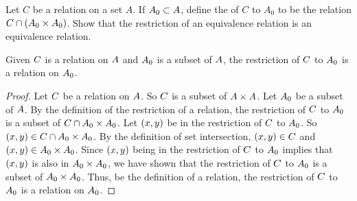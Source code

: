\documentclass[../main.tex]{subfiles}
\begin{document}
\problem{}\label{s03p02}

Let \(C\) be a relation on a set \(A\). If \(A_0 \subset A\), define the
 of \(C\) to \(A_0\) to be the relation
\(C \cap (A_0 \times A_0)\). Show that the restriction of an equivalence
relation is an equivalence relation.

\begin{thm}
	Given \({C}\) is a relation on \({A}\) and
	\({A_0}\) is a subset of \({A}\), the restriction of
	\({C}\) to \({A_0}\) is a relation on
	\({A_0}\).
\end{thm}
\begin{proof}
	Let \({C}\) be a relation on \({A}\). So
	\({C}\) is a subset of
	\({{A}} \times {{A}}\). Let \({A_0}\)
	be a subset of \({A}\). By the definition of the restriction of a
	relation, the restriction of \({C}\) to \({A_0}\) is
	a subset of
	\({C} \cap {{A_0}} \times {{A_0}}\).
	Let \(({x},{y})\) be in the restriction of \({C}\) to
	\({A_0}\). So \(({x},{y}) \in {{C}} \cap {{{A_0}} \times{{A_0}}}\).
	By the definition of set intersection,
	\(({x},{y}) \in {C}\) and
	\(({x},{y}) \in {{A_0}} \times {{A_0}}\).
	Since \(({x},{y})\) being in the restriction of \({C}\)
	to \({A_0}\) implies that \(({x},{y})\) is also in
	\({{A_0}} \times {{A_0}}\), we have shown
	that the restriction of \({C}\) to \({A_0}\) is a
	subset of \({{A_0}} \times {{A_0}}\). Thus,
	be the definition of a relation, the restriction of \({C}\)
	to \({A_0}\) is a relation on \({A_0}\).
\end{proof}
\end{document}
